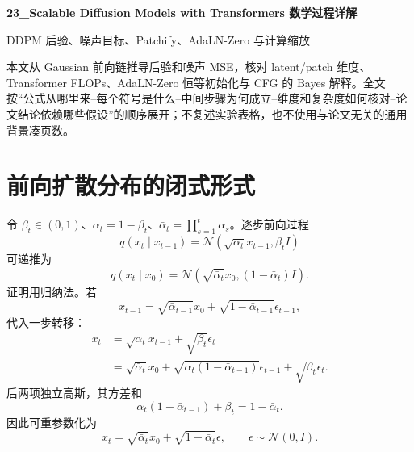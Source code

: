 \documentclass[UTF8,12pt,a4paper,fontset=none]{ctexart}
\numberwithin{equation}{section}
\begin{document}
\begin{center}
{\LARGE\bfseries 23\_Scalable Diffusion Models with Transformers 数学过程详解}\par
\vspace{0.35em}
{\large DDPM 后验、噪声目标、Patchify、AdaLN-Zero 与计算缩放}
\end{center}
\vspace{0.45em}
\begin{keybox}[本文只处理真正需要推导的部分]
本文从 Gaussian 前向链推导后验和噪声 MSE，核对 latent/patch 维度、Transformer FLOPs、AdaLN-Zero 恒等初始化与 CFG 的 Bayes 解释。全文按“公式从哪里来--每个符号是什么--中间步骤为何成立--维度和复杂度如何核对--论文结论依赖哪些假设”的顺序展开；不复述实验表格，也不使用与论文无关的通用背景凑页数。
\end{keybox}
\tableofcontents
\newpage

\section{前向扩散分布的闭式形式}
令 $\beta_t\in(0,1)$、$\alpha_t=1-\beta_t$、$\bar\alpha_t=\prod_{s=1}^{t}\alpha_s$。逐步前向过程
\begin{equation}
 q(x_t\mid x_{t-1})=\mathcal N(\sqrt{\alpha_t}x_{t-1},\beta_t I)
\end{equation}
可递推为
\begin{equation}
 \boxed{q(x_t\mid x_0)=\mathcal N(\sqrt{\bar\alpha_t}x_0,(1-\bar\alpha_t)I)}.
\end{equation}
证明用归纳法。若
\begin{equation}
 x_{t-1}=\sqrt{\bar\alpha_{t-1}}x_0+\sqrt{1-\bar\alpha_{t-1}}\epsilon_{t-1},
\end{equation}
代入一步转移：
\begin{align}
 x_t&=\sqrt{\alpha_t}x_{t-1}+\sqrt{\beta_t}\epsilon_t\\
 &=\sqrt{\bar\alpha_t}x_0+
 \sqrt{\alpha_t(1-\bar\alpha_{t-1})}\epsilon_{t-1}+\sqrt{\beta_t}\epsilon_t.
\end{align}
后两项独立高斯，其方差和
\begin{equation}
 \alpha_t(1-\bar\alpha_{t-1})+\beta_t=1-\bar\alpha_t.
\end{equation}
因此可重参数化为
\begin{equation}
 x_t=\sqrt{\bar\alpha_t}x_0+\sqrt{1-\bar\alpha_t}\epsilon,
 \qquad \epsilon\sim\mathcal N(0,I).
\end{equation}
\end{document}

